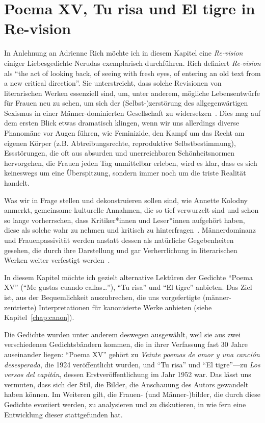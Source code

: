 \section{Poema XV, Tu risa und El tigre in Re-vision}


In Anlehnung an Adrienne Rich möchte ich in diesem Kapitel eine \textit{Re-vision} einiger Liebesgedichte Nerudas exemplarisch durchführen.
Rich definiert \textit{Re-vision} als ``the act of looking back, of seeing with fresh eyes, of entering an old text from a new critical direction''.
Sie unterstreicht, dass solche Revisionen von literarischen Werken essenziell sind, um, unter anderem, mögliche Lebensentwürfe für Frauen neu zu sehen, um sich der (Selbst-)zerstörung des allgegenwärtigen Sexismus in einer Männer-dominierten Gesellschaft zu widersetzen~\cite{Rich1972}.
Dies mag auf dem ersten Blick etwas dramatisch klingen, wenn wir uns allerdings diverse Phanomäne vor Augen führen, wie Feminizide, den Kampf um das Recht am eigenen Körper (z.B. Abtreibungsrechte, reproduktive Selbstbestimmung), Essstörungen, die oft aus absurden und unerreichbaren Schönheitsnormen hervorgehen, die Frauen jeden Tag unmittelbar erleben, wird es klar, dass es sich keineswegs um eine Überspitzung, sondern immer noch um die triste Realität handelt.

Was wir in Frage stellen und dekonstruieren sollen sind, wie Annette Kolodny anmerkt, gemeinsame kulturelle Annahmen, die so tief verwurzelt sind und schon so lange vorherrschen, dass Kritiker*innen und Leser*innen aufgehört haben, diese als solche wahr zu nehmen und kritisch zu hinterfragen~\cite{Kolodny1980}.
Männerdominanz und Frauenpassivität werden anstatt dessen als natürliche Gegebenheiten gesehen, die durch ihre Darstellung und gar Verherrlichung in literarischen Werken weiter verfestigt werden~\cite{Duncan1992}.

In diesem Kapitel möchte ich gezielt alternative Lektüren der Gedichte ``Poema XV'' (``Me gustas cuando callas\ldots''), ``Tu risa'' und ``El tigre'' anbieten. 
Das Ziel ist, aus der Bequemlichkeit auszubrechen, die uns vorgefertigte (männer-zentrierte) Interpretationen für kanonisierte Werke anbieten (siehe Kapitel~\ref{chap:canon}).

Die Gedichte wurden unter anderem deswegen ausgewählt, weil sie aus zwei verschiedenen Gedichtsbändern kommen, die in ihrer Verfassung fast 30 Jahre auseinander liegen:
``Poema XV'' gehört zu \textit{Veinte poemas de amor y una canción desesperada}, die 1924 veröffentlicht wurden, und ``Tu risa'' und ``El tigre''—zu \textit{Los versos del capitán}, dessen Erstveröffentlichung im Jahr 1952 war.
Das lässt uns vermuten, dass sich der Stil, die Bilder, die Anschauung des Autors gewandelt haben können.
Im Weiteren gilt, die Frauen- (und Männer-)bilder, die durch diese Gedichte evoziiert werden, zu analysieren und zu diskutieren, in wie fern eine Entwicklung dieser stattgefunden hat.

